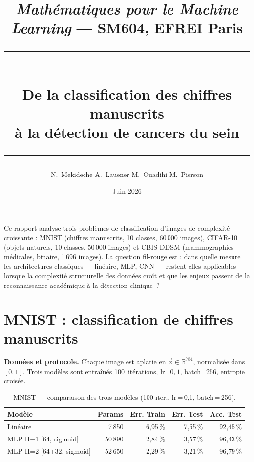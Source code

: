 \documentclass[10pt, a4paper]{article}
\title{\vspace{-1.8cm}%
  {\small\textit{Mathématiques pour le Machine Learning} — SM604, EFREI Paris}\\[0.25cm]%
  \rule{\linewidth}{0.8pt}\\[0.2cm]%
  \large\textbf{De la classification des chiffres manuscrits\\[0.05cm]
                à la détection de cancers du sein}\\[0.2cm]%
  \rule{\linewidth}{0.8pt}%
}
\author{N.~Mekideche \quad A.~Lauener \quad M.~Ouadihi \quad M.~Pierson}
\date{Juin 2026}
\begin{document}
\maketitle
\vspace{-0.6cm}


Ce rapport analyse trois problèmes de classification d'images de complexité croissante :
MNIST (chiffres manuscrits, 10 classes, 60\,000 images), CIFAR-10 (objets naturels, 10
classes, 50\,000 images) et CBIS-DDSM (mammographies médicales, binaire, 1\,696 images).
La question fil-rouge est : dans quelle mesure les architectures classiques — linéaire,
MLP, CNN — restent-elles applicables lorsque la complexité structurelle des données croît
et que les enjeux passent de la reconnaissance académique à la détection clinique~?

\section{MNIST : classification de chiffres manuscrits}

\textbf{Données et protocole.}
Chaque image est aplatie en $\vec{x} \in \mathbb{R}^{784}$, normalisée dans $[0,1]$.
Trois modèles sont entraînés 100~itérations, lr=$0{,}1$, batch=256, entropie croisée.


\begin{table}[H]
\centering
\caption{MNIST — comparaison des trois modèles (100 iter., lr\,=\,0{,}1, batch\,=\,256).}
\label{tab:mnist}
\begin{tabular}{lrrrr}
\toprule
\textbf{Modèle} & \textbf{Params} & \textbf{Err. Train} & \textbf{Err. Test} & \textbf{Acc. Test} \\
\midrule
Linéaire                & 7\,850   & 6{,}95\,\% & 7{,}55\,\% & 92{,}45\,\% \\
MLP H=1 [64, sigmoid]   & 50\,890  & 2{,}84\,\% & 3{,}57\,\% & 96{,}43\,\% \\
MLP H=2 [64+32, sigmoid]& 52\,650  & 2{,}29\,\% & 3{,}21\,\% & 96{,}79\,\% \\
\bottomrule
\end{tabular}
\end{table}
\end{document}
